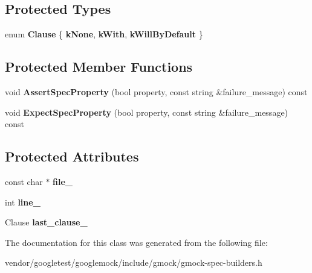 \subsection*{Protected Types}
\begin{DoxyCompactItemize}
\item 
\mbox{\label{classtesting_1_1internal_1_1_untyped_on_call_spec_base_a78ebf16bfee40375e33a983f3100f354}} 
enum {\bfseries Clause} \{ {\bfseries k\+None}, 
{\bfseries k\+With}, 
{\bfseries k\+Will\+By\+Default}
 \}
\end{DoxyCompactItemize}
\subsection*{Protected Member Functions}
\begin{DoxyCompactItemize}
\item 
\mbox{\label{classtesting_1_1internal_1_1_untyped_on_call_spec_base_a83d223cf0e48fadc872a7b4062948df4}} 
void {\bfseries Assert\+Spec\+Property} (bool property, const string \&failure\+\_\+message) const
\item 
\mbox{\label{classtesting_1_1internal_1_1_untyped_on_call_spec_base_a7eeba49b7b2968ebb4859c04684828b2}} 
void {\bfseries Expect\+Spec\+Property} (bool property, const string \&failure\+\_\+message) const
\end{DoxyCompactItemize}
\subsection*{Protected Attributes}
\begin{DoxyCompactItemize}
\item 
\mbox{\label{classtesting_1_1internal_1_1_untyped_on_call_spec_base_adf4e6c5022dfeb482f5328e9bb58ba88}} 
const char $\ast$ {\bfseries file\+\_\+}
\item 
\mbox{\label{classtesting_1_1internal_1_1_untyped_on_call_spec_base_a1dfa0dafaae6697f17adf5d837ca77c7}} 
int {\bfseries line\+\_\+}
\item 
\mbox{\label{classtesting_1_1internal_1_1_untyped_on_call_spec_base_adb6d19adfeb5fde535d854aedbc5fb0f}} 
Clause {\bfseries last\+\_\+clause\+\_\+}
\end{DoxyCompactItemize}


The documentation for this class was generated from the following file\+:\begin{DoxyCompactItemize}
\item 
vendor/googletest/googlemock/include/gmock/gmock-\/spec-\/builders.\+h\end{DoxyCompactItemize}
